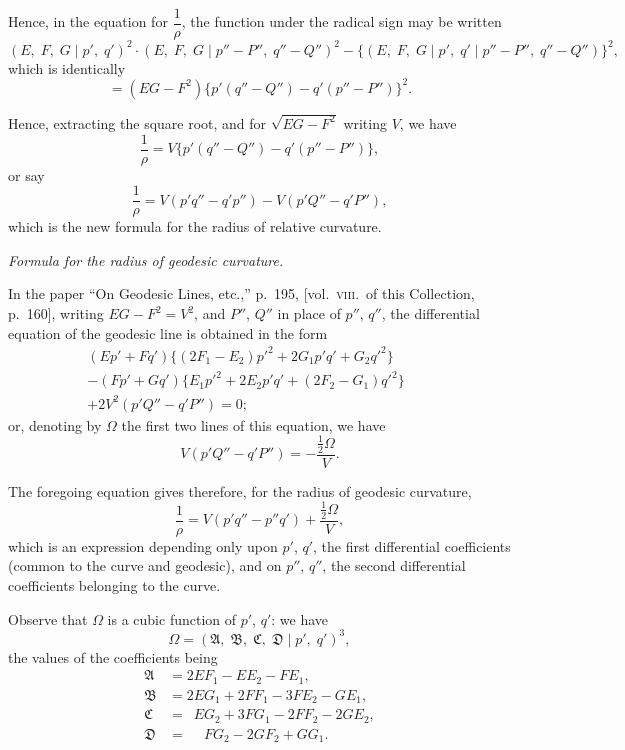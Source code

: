 \documentclass[11pt,a4paper,english]{article}
\theoremstyle{plain}
\begin{document}
Hence, in the equation for $\dfrac{1}{\rho}$, the function under the radical sign may be written
\[
(E,\; F,\; G \mid p',\; q')^2 \cdot (E,\; F,\; G \mid p'' - P'',\; q'' - Q'')^2 - \{(E,\; F,\; G \mid p',\; q' \mid p'' - P'',\; q'' - Q'')\}^2,
\]
which is identically
\[
= (EG - F^2)\{p'(q'' - Q'') - q'(p'' - P'')\}^2.
\]

Hence, extracting the square root, and for $\sqrt{EG - F^2}$ writing $V$, we have
\[
\frac{1}{\rho} = V\{p'(q'' - Q'') - q'(p'' - P'')\},
\]
or say
\[
\frac{1}{\rho} = V(p'q'' - q'p'') - V(p'Q'' - q'P''),
\]
which is the new formula for the radius of relative curvature.

\begin{center}
\textit{Formula for the radius of geodesic curvature.}
\end{center}

In the paper ``On Geodesic Lines, etc.,'' p.\ 195, [vol.\ \textsc{viii}.\ of this Collection, p.\ 160], writing $EG - F^2 = V^2$, and $P''$, $Q''$ in place of $p''$, $q''$, the differential equation of the geodesic line is obtained in the form
\begin{align*}
(Ep' + Fq')\{(2F_1 - E_2)p'^2 + 2G_1 p'q' + G_2 q'^2\} \quad\quad \\
- (Fp' + Gq')\{E_1 p'^2 + 2E_2 p'q' + (2F_2 - G_1)q'^2\} \quad\quad \\
+ 2V^2(p'Q'' - q'P'') = 0;
\end{align*}
or, denoting by $\Omega$ the first two lines of this equation, we have
\[
V(p'Q'' - q'P'') = -\frac{\tfrac{1}{2}\Omega}{V}.
\]

The foregoing equation gives therefore, for the radius of geodesic curvature,
\[
\frac{1}{\rho} = V(p'q'' - p''q') + \frac{\tfrac{1}{2}\Omega}{V},
\]
which is an expression depending only upon $p'$, $q'$, the first differential coefficients (common to the curve and geodesic), and on $p''$, $q''$, the second differential coefficients belonging to the curve.

Observe that $\Omega$ is a cubic function of $p'$, $q'$: we have
\[
\Omega = (\mathfrak{A},\; \mathfrak{B},\; \mathfrak{C},\; \mathfrak{D} \mid p',\; q')^3,
\]
the values of the coefficients being
\begin{align*}
\mathfrak{A} &= 2EF_1 - EE_2 - FE_1, \\
\mathfrak{B} &= 2EG_1 + 2FF_1 - 3FE_2 - GE_1, \\
\mathfrak{C} &= \phantom{2}EG_2 + 3FG_1 - 2FF_2 - 2GE_2, \\
\mathfrak{D} &= \phantom{2E}FG_2 - 2GF_2 + GG_1.
\end{align*}
\end{document}
